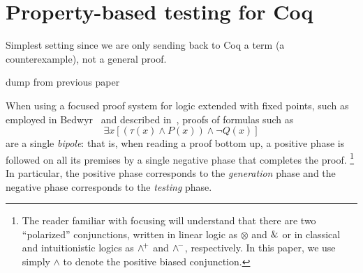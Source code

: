 \section{Property-based testing for Coq}

Simplest setting since we are only sending back to Coq a term (a
counterexample), not a general proof.

\begin{metanote}
  dump from previous paper
\end{metanote}

When using a focused proof system for logic extended with fixed
points, such as  employed in Bedwyr~\cite{baelde07cade} and described
in~\cite{baelde12tocl,heath17linearity}, proofs of formulas such as
\[
  \exists x [(\tau(x)\wedge P(x)) \wedge \neg Q(x)]
  \tag{*}\label{eq:full}
\]
are a single \emph{bipole}: that is, when reading a proof bottom up, a
positive phase is followed on all its premises by a single negative
phase that completes the proof.%
\footnote{The reader familiar with focusing will understand that there
are two ``polarized'' conjunctions, written in linear logic as
$\otimes$ and $\&$ or in classical and intuitionistic logics as
$\wedge^{\!+}$ and $\wedge^{\!-}$, respectively.  In this paper, we use simply
$\wedge$ to denote the positive biased conjunction.}
%
In particular, the positive phase corresponds to the \emph{generation} phase
and the negative phase corresponds to the \emph{testing} phase.
%

